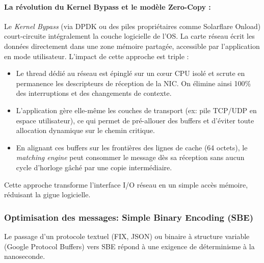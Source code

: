 \paragraph{La révolution du Kernel Bypass et le modèle Zero-Copy :}
Le \textit{Kernel Bypass} (via DPDK ou des piles propriétaires comme Solarflare Onload) court-circuite intégralement la couche logicielle de l'OS. La carte réseau écrit les données directement dans une zone mémoire partagée, accessible par l'application en mode utilisateur. L'impact de cette approche est triple :

\begin{itemize}
    \item Le thread dédié au réseau est épinglé sur un cœur CPU isolé et scrute en permanence les descripteurs de réception de la NIC. On élimine ainsi 100\% des interruptions et des changements de contexte.
    
    \item L'application gère elle-même les couches de transport (ex: pile TCP/UDP en espace utilisateur), ce qui permet de pré-allouer des buffers et d'éviter toute allocation dynamique sur le chemin critique.
    
    \item En alignant ces buffers sur les frontières des lignes de cache (64 octets), le \textit{matching engine} peut consommer le message dès sa réception sans aucun cycle d'horloge gâché par une copie intermédiaire.
\end{itemize}

Cette approche transforme l'interface I/O réseau en un simple accès mémoire, réduisant la gigue logicielle.

\subsubsection{Optimisation des messages: Simple Binary Encoding (SBE)}
Le passage d'un protocole textuel (FIX, JSON) ou binaire à structure variable (Google Protocol Buffers) vers SBE répond à une exigence de déterminisme à la nanoseconde.

